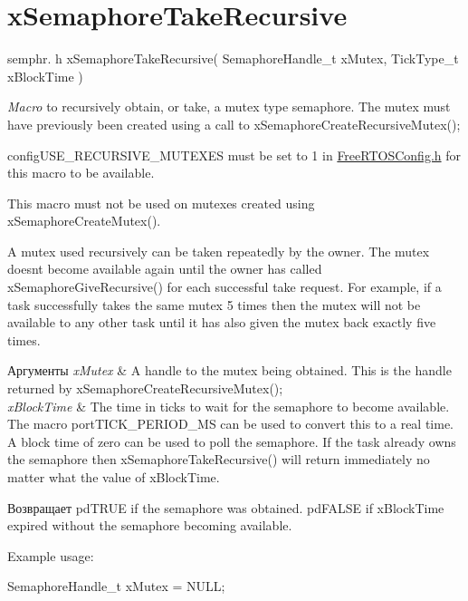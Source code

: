 \hypertarget{group__x_semaphore_take_recursive}{}\section{x\+Semaphore\+Take\+Recursive}
\label{group__x_semaphore_take_recursive}
semphr. h x\+Semaphore\+Take\+Recursive( Semaphore\+Handle\+\_\+t x\+Mutex, Tick\+Type\+\_\+t x\+Block\+Time )

{\itshape Macro} to recursively obtain, or \textquotesingle{}take\textquotesingle{}, a mutex type semaphore. The mutex must have previously been created using a call to x\+Semaphore\+Create\+Recursive\+Mutex();

config\+U\+S\+E\+\_\+\+R\+E\+C\+U\+R\+S\+I\+V\+E\+\_\+\+M\+U\+T\+E\+X\+ES must be set to 1 in \mbox{\hyperlink{_free_r_t_o_s_config_8h}{Free\+R\+T\+O\+S\+Config.\+h}} for this macro to be available.

This macro must not be used on mutexes created using x\+Semaphore\+Create\+Mutex().

A mutex used recursively can be \textquotesingle{}taken\textquotesingle{} repeatedly by the owner. The mutex doesn\textquotesingle{}t become available again until the owner has called x\+Semaphore\+Give\+Recursive() for each successful \textquotesingle{}take\textquotesingle{} request. For example, if a task successfully \textquotesingle{}takes\textquotesingle{} the same mutex 5 times then the mutex will not be available to any other task until it has also \textquotesingle{}given\textquotesingle{} the mutex back exactly five times.


\begin{DoxyParams}{Аргументы}
{\em x\+Mutex} & A handle to the mutex being obtained. This is the handle returned by x\+Semaphore\+Create\+Recursive\+Mutex();\\
\hline
{\em x\+Block\+Time} & The time in ticks to wait for the semaphore to become available. The macro port\+T\+I\+C\+K\+\_\+\+P\+E\+R\+I\+O\+D\+\_\+\+MS can be used to convert this to a real time. A block time of zero can be used to poll the semaphore. If the task already owns the semaphore then x\+Semaphore\+Take\+Recursive() will return immediately no matter what the value of x\+Block\+Time.\\
\hline
\end{DoxyParams}
\begin{DoxyReturn}{Возвращает}
pd\+T\+R\+UE if the semaphore was obtained. pd\+F\+A\+L\+SE if x\+Block\+Time expired without the semaphore becoming available.
\end{DoxyReturn}
Example usage\+: 
\begin{DoxyPre}
SemaphoreHandle\_t xMutex = NULL;\end{DoxyPre}



